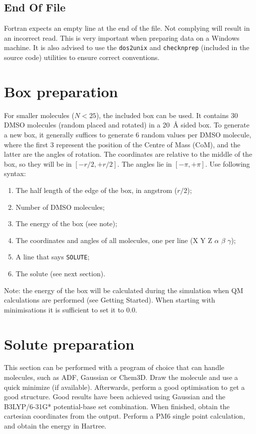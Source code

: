 \subsection{End Of File}
Fortran expects an empty line at the end of the file. Not complying will result 
in an incorrect read. This is very important when preparing data on a Windows 
machine. It is also advised to use the \verb|dos2unix| and \verb|checknprep| 
(included in the source code) utilities to ensure correct conventions.

\section{Box preparation}
For smaller molecules ($N < 25$), the included box can be used. It contains 30 
DMSO molecules (random placed and rotated) in a \SI{20}{\angstrom} sided box.
To generate a new box, it generally suffices to generate 6 random values per 
DMSO molecule, where the first 3 represent the position of the Centre of Mass 
(CoM), and the latter are the angles of rotation. The coordinates are relative 
to the middle of the box, so they will be in $[-r/2, +r/2]$. The angles lie in 
$[-\pi, +\pi]$. Use following syntax:

\begin{enumerate}
	\item The half length of the edge of the box, in angstrom ($r/2$);
	\item Number of DMSO molecules;
	\item The energy of the box (see note);
	\item The coordinates and angles of all molecules, one per line (X Y Z 
	$\alpha$ $\beta$ $\gamma$);
	\item A line that says \verb|SOLUTE|;
	\item The solute (see next section).
\end{enumerate}

Note: the energy of the box will be calculated during the simulation when QM 
calculations are performed (see Getting Started). When starting with 
minimisations it is sufficient to set it to $0.0$.

\section{Solute preparation}
This section can be performed with a program of choice that can handle 
molecules, such as ADF, Gaussian or Chem3D. Draw the molecule and use a quick 
minimize (if available). Afterwards, perform a good optimisation to get a good 
structure. Good results have been achieved using Gaussian and the B3LYP/6-31G* 
potential-base set combination.
When finished, obtain the cartesian coordinates from the output. Perform a PM6 
single point calculation, and obtain the energy in Hartree.

